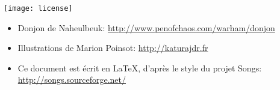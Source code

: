 \vspace{0.5cm}
\begin{center}
  \texttt{[image: license]}
\end{center}
\vspace{0.5cm}

\begin{itemize}
\item Donjon de Naheulbeuk: \url{http://www.penofchaos.com/warham/donjon}
\item Illustrations de Marion Poinsot: \url{http://katurajdr.fr}
\item Ce document est écrit en \LaTeX, d'après le style du projet Songs: \url{http://songs.sourceforge.net/}
\end{itemize}


